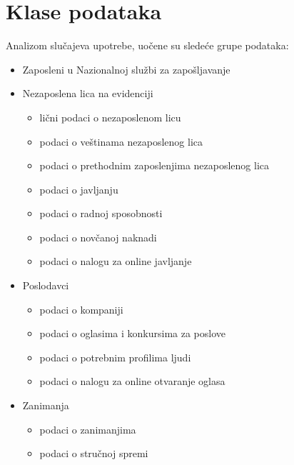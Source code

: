 \section{Klase podataka}

Analizom slu\v cajeva upotrebe, uo\v cene su slede\' ce grupe podataka:

\begin{itemize}
	\item Zaposleni u Nazionalnoj slu\v zbi za zapo\v sljavanje
	\item Nezaposlena lica na evidenciji
		\begin{itemize}
			\item  li\v cni podaci o nezaposlenom licu
			\item podaci o ve\v stinama nezaposlenog lica
			\item podaci o prethodnim zaposlenjima nezaposlenog lica
			\item podaci o javljanju
			\item podaci o radnoj sposobnosti
			\item podaci o nov\v canoj naknadi 
			\item podaci o nalogu za online javljanje
		\end{itemize}
	\item Poslodavci
		\begin{itemize}
			\item podaci o kompaniji
			\item podaci o oglasima i konkursima za poslove
			\item podaci o potrebnim profilima ljudi
			\item podaci o nalogu za online otvaranje oglasa
		\end{itemize}
	\item Zanimanja
		\begin{itemize}
			\item podaci o zanimanjima
			\item podaci o stru\v cnoj spremi
		\end{itemize}
\end{itemize}

